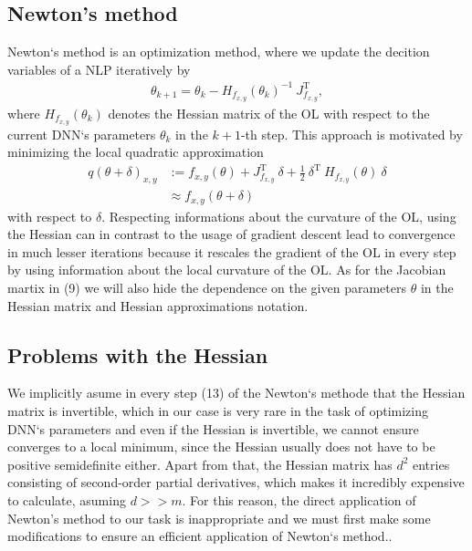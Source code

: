 \documentclass[conference]{IEEEtran}
\begin{document}
	\subsection{Newton's method}\label{AA}
	Newton`s method is an optimization method, where we update the decition variables of a NLP iteratively by
	\begin{align}
	\theta_{k+1} = \theta_{k} -H_{f_{x, y}}(\theta_{k})^{-1}\:J_{f_{x, y}}^{\mathrm{T}},
	\end{align}
	where $H_{f_{x, y}}(\theta_{k})$ denotes the Hessian matrix of the OL with respect to the current DNN`s parameters $\theta_{k}$ in the $k+1$-th step. This approach is motivated by minimizing the local quadratic approximation
	\begin{align}
	q(\theta + \delta)_{x, y} &:= f_{x, y}(\theta) + J_{f_{x, y}}^{\mathrm{T}}\:\delta + \frac{1}{2}\:\delta^{\mathrm{T}}\:H_{f_{x, y}}(\theta)\:\delta\\
	&\approx f_{x, y}(\theta + \delta)
	\end{align}
	with respect to $\delta$. 
	Respecting informations about the curvature of the OL, using the Hessian can in contrast to the usage of gradient descent lead to convergence in much lesser iterations because it rescales the gradient of the OL in every step by using information about the local curvature of the OL. As for the Jacobian martix in (9) we will also hide the dependence on the given parameters $\theta$ in the Hessian matrix and Hessian approximations notation.
	
	\subsection{Problems with the Hessian}
	We implicitly asume in every step (13) of the Newton`s methode that the Hessian matrix is invertible, which in our case is very rare in the task of optimizing DNN`s parameters and even if the Hessian is invertible, we cannot ensure converges to a local minimum, since the Hessian usually does not have to be positive semidefinite either. Apart from that, the Hessian matrix has $d^{2}$ entries consisting of second-order partial derivatives, which makes it incredibly expensive to calculate, asuming $d>>m$. For this reason, the direct application of Newton's method to our task is inappropriate and we must first make some modifications to ensure an efficient application of Newton`s method..
	
\end{document}
